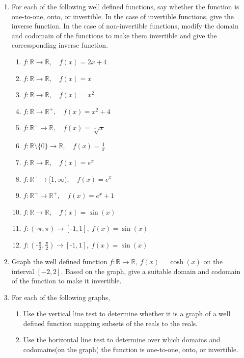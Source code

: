 \documentclass[11pt,a4paper,titlepage,oneside,openany]{article}
\numberwithin{equation}{section}
\numberwithin{algorithm}{section}
\numberwithin{figure}{section}
\numberwithin{table}{section}
\newcommand{\mb}{\mathbb}
\begin{document}
\begin{enumerate}
\item
  For each of the following well defined functions, say whether the function is one-to-one, onto, or invertible. In the case of invertible functions, give the inverse function. In the case of non-invertible functions, modify the domain and codomain of the functions to make them invertible and give the corressponding inverse function.
  \begin{multicols}{2}
    \begin{enumerate}
    \item $f: \mb{R} \to \mb{R},\quad f(x)=2x+4$
    \item $f: \mb{R} \to \mb{R},\quad f(x)=x$
    \item $f: \mb{R} \to \mb{R},\quad f(x)=x^2$
    \item $f: \mb{R} \to \mb{R}^+,\quad f(x)=x^2+4$
    \item $f: \mb{R}^+ \to \mb{R},\quad f(x)=\sqrt[+]{x}$
    \item $f: \mb{R}\setminus\{0\} \to \mb{R},\quad f(x)=\frac{1}{x}$
    \item $f: \mb{R} \to \mb{R},\quad f(x)=e^x$
    \item $f: \mb{R}^+ \to [1,\infty),\quad f(x)=e^x$
    \item $f: \mb{R}^+ \to \mb{R}^+,\quad f(x)=e^x+1$
    \item $f: \mb{R} \to \mb{R},\quad f(x)=\sin(x)$
    \item $f: (\text{-}\pi,\pi) \to [\text{-}1,1],\  f(x)=\sin(x)$
    \item $f: (\text{-}\frac{\pi}{2},\frac{\pi}{2}) \to [\text{-}1,1],\  f(x)=\sin(x)$
    \end{enumerate}
  \end{multicols}

\item
  Graph the well defined function $f: \mb{R} \to \mb{R}, \ f(x)=\cosh(x)$ on the interval $[-2,2]$. Based on the graph, give a suitable domain and codomain of the function to make it invertible. 

\pagebreak

\item For each of the following graphs,
  \begin{enumerate}
    \item  Use the vertical line test to determine whether it is a graph of a well defined function mapping subsets of the reals to the reals.
    \item  Use the horizontal line test to determine over which domains and codomains(on the graph) the function is one-to-one, onto, or invertible.
  \end{enumerate}



\end{enumerate}
\end{document}
